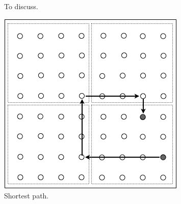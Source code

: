 \begin{enumerate}
\begin{figure}[hbt]
\begin{center}
       \caption{To discuss.}
\end{center}
\end{figure}
 \begin{figure}[hbt]
\begin{center}
       \includegraphics[scale=0.5]{FiguresGraph/routingCity3}
       \caption{Shortest path.}
\end{center}
\end{figure}
\end{enumerate}



